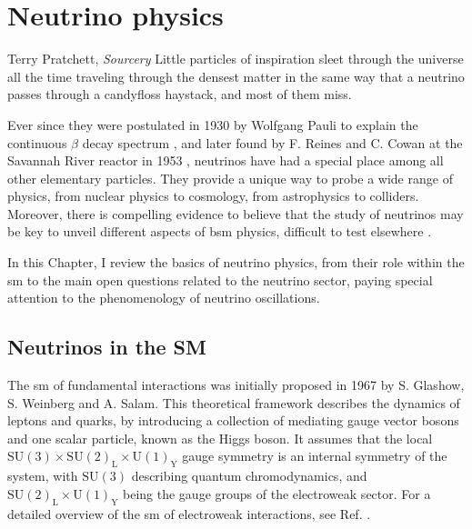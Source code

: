 \chapter{Neutrino physics}\label{chapter:neutrinos}

\begin{chapquote}{Terry Pratchett, \textit{Sourcery}}
	Little particles of inspiration sleet through the universe all the time traveling through the densest matter in the same way that a neutrino passes through a candyfloss haystack, and most of them miss.
\end{chapquote}

Ever since they were postulated in 1930 by Wolfgang Pauli to explain the continuous $\beta$ decay spectrum \cite{Pauli1930}, and later found by F. Reines and C. Cowan at the Savannah River reactor in 1953 \cite{Reines1953}, neutrinos have had a special place among all other elementary particles. They provide a unique way to probe a wide range of physics, from nuclear physics to cosmology, from astrophysics to colliders. Moreover, there is compelling evidence to believe that the study of neutrinos may be key to unveil different aspects of \gls{bsm} physics, difficult to test elsewhere \cite{Arguelles2019}.

In this Chapter, I review the basics of neutrino physics, from their role within the \gls{sm} to the main open questions related to the neutrino sector, paying special attention to the phenomenology of neutrino oscillations.

\section{Neutrinos in the SM}\label{sec:sm_and_nu}

The \gls{sm} of fundamental interactions was initially proposed in 1967 by S. Glashow, S. Weinberg and A. Salam\cite{Glashow1961,Weinberg1967,Salam1968}. This theoretical framework describes the dynamics of leptons and quarks, by introducing a collection of mediating gauge vector bosons and one scalar particle, known as the Higgs boson. It assumes that the local $\mathrm{SU}(3)\times\mathrm{SU}(2)_{\mathrm{L}}\times\mathrm{U}(1)_{\mathrm{Y}}$ gauge symmetry is an internal symmetry of the system, with $\mathrm{SU}(3)$ describing quantum chromodynamics, and $\mathrm{SU}(2)_{\mathrm{L}}\times\mathrm{U}(1)_{\mathrm{Y}}$ being the gauge groups of the electroweak sector. For a detailed overview of the \gls{sm} of electroweak interactions, see Ref. \cite{Pich2012}.

